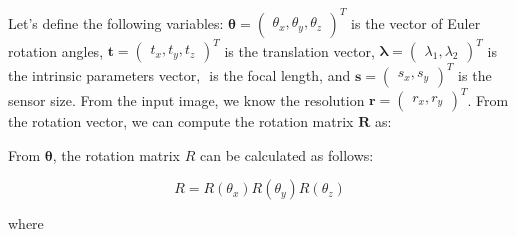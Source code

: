 Let's define the following variables: \(\boldsymbol{\theta} = \begin{pmatrix}
	\theta_x, \theta_y, \theta_z
\end{pmatrix}^{T}\) is the vector of Euler rotation angles, \(\mathbf{t} = \begin{pmatrix}
	t_x, t_y, t_z
\end{pmatrix}^{T}\) is the translation vector, \(\boldsymbol{\lambda} = \begin{pmatrix}
	\lambda_1, \lambda_2
\end{pmatrix}^{T}\) is the intrinsic parameters vector, \(\) is the focal
length, and \(\mathbf{s} = \begin{pmatrix}
	s_x, s_y
\end{pmatrix}^{T}\) is the sensor size.
From the input image, we know the resolution \(\mathbf{r} = \begin{pmatrix}
	r_x, r_y
\end{pmatrix}^{T}\).
From the rotation vector, we can compute the rotation matrix \(\mathbf{R}\) as:

From \(\boldsymbol{\theta}\), the rotation matrix $R$ can be calculated as follows:

\begin{equation}
	R = R(\theta_x) R(\theta_y) R(\theta_z)
\end{equation}

where

